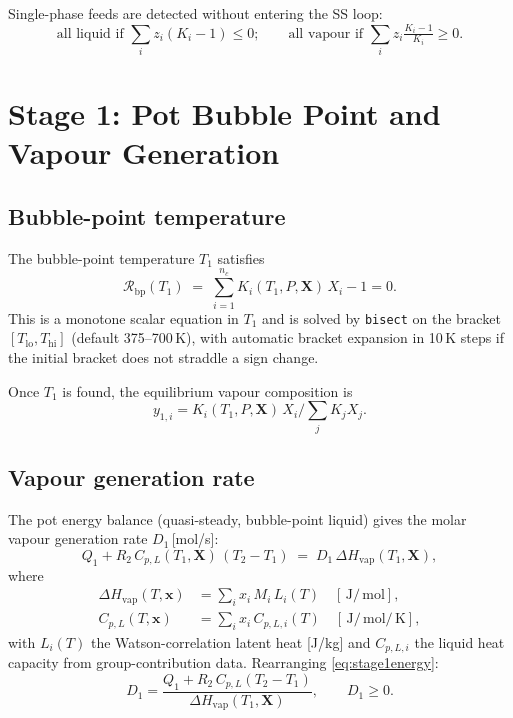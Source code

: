 \documentclass[11pt,letterpaper]{article}
\newcommand{\mol}{\,\text{mol}}
\newcommand{\J}{\,\text{J}}
\newcommand{\K}{\,\text{K}}
\begin{document}
Single-phase feeds are detected without entering the SS loop:
\begin{equation}
  \text{all liquid if } \sum_i z_i(K_i-1) \le 0; \qquad
  \text{all vapour if } \sum_i z_i\tfrac{K_i-1}{K_i} \ge 0.
\end{equation}

\section{Stage 1: Pot Bubble Point and Vapour Generation}
\label{sec:stage1}

\subsection{Bubble-point temperature}

The bubble-point temperature $T_1$ satisfies
\begin{equation}
  \mathcal{R}_{\mathrm{bp}}(T_1) \;=\; \sum_{i=1}^{n_c} K_i(T_1, P, \mathbf{X})\, X_i - 1 = 0.
  \label{eq:bpresidual}
\end{equation}
This is a monotone scalar equation in $T_1$ and is solved by \texttt{bisect}
on the bracket $[T_{\mathrm{lo}}, T_{\mathrm{hi}}]$ (default 375--700\,K),
with automatic bracket expansion in 10\,K steps if the initial bracket does
not straddle a sign change.

Once $T_1$ is found, the equilibrium vapour composition is
\begin{equation}
  y_{1,i} = K_i(T_1, P, \mathbf{X})\, X_i \bigg/ \sum_j K_j X_j.
\end{equation}

\subsection{Vapour generation rate}

The pot energy balance (quasi-steady, bubble-point liquid) gives the molar
vapour generation rate $D_1$\,[mol/s]:
\begin{equation}
  Q_1 + R_2\, C_{p,L}(T_1, \mathbf{X})\,(T_2 - T_1)
  \;=\; D_1\, \Delta H_{\mathrm{vap}}(T_1, \mathbf{X}),
  \label{eq:stage1energy}
\end{equation}
where
\begin{align}
  \Delta H_{\mathrm{vap}}(T, \mathbf{x}) &= \sum_i x_i\, M_i\, L_i(T) \quad [\J/\mol], \\
  C_{p,L}(T, \mathbf{x}) &= \sum_i x_i\, C_{p,L,i}(T) \quad [\J/\mol/\K],
\end{align}
with $L_i(T)$ the Watson-correlation latent heat [J/kg] and $C_{p,L,i}$ the
liquid heat capacity from group-contribution data.  Rearranging
\cref{eq:stage1energy}:
\begin{equation}
  D_1 = \frac{Q_1 + R_2\, C_{p,L}(T_2 - T_1)}{\Delta H_{\mathrm{vap}}(T_1, \mathbf{X})},
  \qquad D_1 \ge 0.
  \label{eq:D1}
\end{equation}
\end{document}
